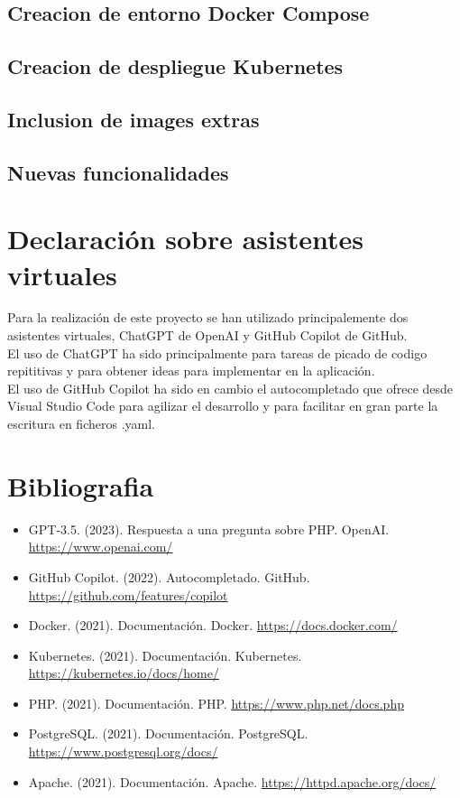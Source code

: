 \documentclass{report}
\begin{document}
        \section{Creacion de entorno Docker Compose}
        \clearpage
        \section{Creacion de despliegue Kubernetes}
        \clearpage
        \section{Inclusion de images extras}
        \clearpage
        \section{Nuevas funcionalidades}
    \chapter{Declaración sobre asistentes virtuales}
        Para la realización de este proyecto se han utilizado principalemente dos asistentes virtuales, ChatGPT de OpenAI y GitHub Copilot de GitHub.\\

        El uso de ChatGPT ha sido principalmente para tareas de picado de codigo repititivas y para obtener ideas para implementar en la aplicación.\\

        El uso de GitHub Copilot ha sido en cambio el autocompletado que ofrece desde Visual Studio Code para agilizar el desarrollo y para facilitar en gran parte la escritura en ficheros .yaml.\\
    \chapter{Bibliografia}
    \begin{itemize}
        \item GPT-3.5. (2023). Respuesta a una pregunta sobre PHP. OpenAI. \url{https://www.openai.com/}
        \item GitHub Copilot. (2022). Autocompletado. GitHub. \url{https://github.com/features/copilot}
        \item Docker. (2021). Documentación. Docker. \url{https://docs.docker.com/}
        \item Kubernetes. (2021). Documentación. Kubernetes. \url{https://kubernetes.io/docs/home/}
        \item PHP. (2021). Documentación. PHP. \url{https://www.php.net/docs.php}
        \item PostgreSQL. (2021). Documentación. PostgreSQL. \url{https://www.postgresql.org/docs/}
        \item Apache. (2021). Documentación. Apache. \url{https://httpd.apache.org/docs/}
    \end{itemize}
\end{document}
